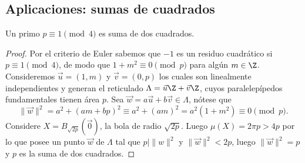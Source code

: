 \documentclass[teoria-numeros.tex]{subfiles}
\begin{document}



\subsection{Aplicaciones: sumas de cuadrados}
\begin{thm}
	Un primo $p \equiv 1 \pmod 4$ es suma de dos cuadrados.
\end{thm}
\begin{proof}
	Por el criterio de Euler sabemos que $-1$ es un residuo cuadrático si $p \equiv 1 \pmod 4$, de modo que $1 + m^2 \equiv 0 \pmod p$
	para algún $m \in \Z$.
	Consideremos $\vec u = (1, m)$ y $\vec v = (0, p)$ los cuales son linealmente independientes y generan el reticulado $\Lambda = \vec u\Z + \vec v\Z$,
	cuyos paralelepípedos fundamentales tienen área $p$.
	Sea $\vec w = a\vec u + b\vec v \in \Lambda$, nótese que
	$$ \|\vec w\|^2 = a^2 + (am + bp)^2 \equiv a^2 + (am)^2 = a^2(1 + m^2) \equiv 0 \pmod p. $$
	Considere $X = B_{\sqrt{2p}}(\Vec 0)$, la bola de radio $\sqrt{2p}$.
	Luego $\mu(X) = 2\pi p > 4p$ por lo que posee un punto $\vec w$ de $\Lambda$ tal que $p \mid \|w\|^2$ y $\|\vec w\|^2 < 2p$,
	luego $\|\vec w\|^2 = p$ y $p$ es la suma de dos cuadrados.
\end{proof}
\end{document}
